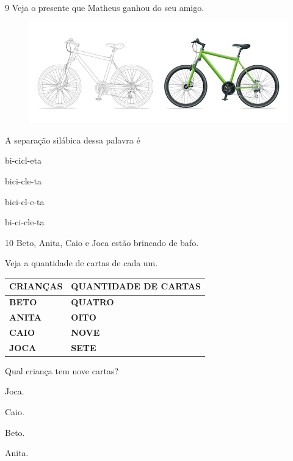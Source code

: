 \num{9} Veja o presente que Matheus ganhou do seu amigo.

\begin{figure}[htpb!]
\centering
\includegraphics[width=.5\textwidth]{media/image180.jpeg}
\end{figure}


A separação silábica dessa palavra é

\begin{escolha}
\item bi-cicl-eta

\item bici-cle-ta

\item bici-cl-e-ta

\item bi-ci-cle-ta
\end{escolha}

\num{10} Beto, Anita, Caio e Joca estão brincado de bafo.

Veja a quantidade de cartas de cada um.

\begin{longtable}[]{@{}ll@{}}
\toprule
\textbf{CRIANÇAS} & \textbf{QUANTIDADE DE CARTAS}\tabularnewline
\midrule
\endhead
\textbf{BETO} & \textbf{QUATRO}\tabularnewline
\textbf{ANITA} & \textbf{OITO}\tabularnewline
\textbf{CAIO} & \textbf{NOVE}\tabularnewline
\textbf{JOCA} & \textbf{SETE}\tabularnewline
\bottomrule
\end{longtable}

Qual criança tem nove cartas?

\begin{escolha}
\item Joca.

\item Caio.

\item Beto.

\item Anita.
\end{escolha}

